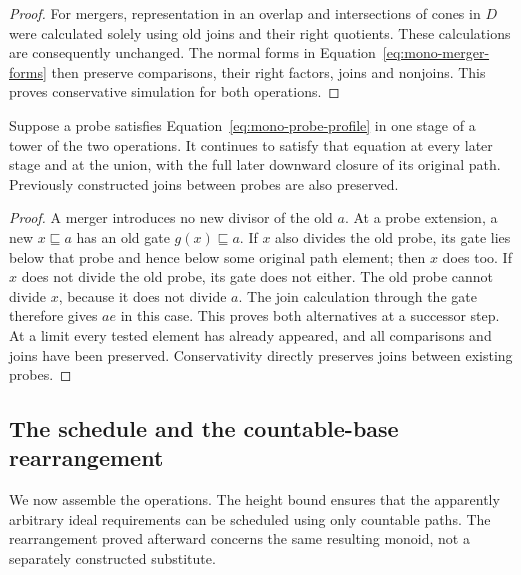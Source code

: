 \begin{proof}
For mergers, representation in an overlap and intersections of cones
in $D$ were calculated solely using old joins and their right
quotients.  These calculations are consequently unchanged.  The
normal forms in Equation~\eqref{eq:mono-merger-forms} then preserve
comparisons, their right factors, joins and nonjoins.  This proves
conservative simulation for both operations.
\end{proof}

\begin{lemma}\label{lem:mono-profile-persistence}
Suppose a probe satisfies Equation~\eqref{eq:mono-probe-profile} in
one stage of a tower of the two operations.  It continues to satisfy
that equation at every later stage and at the union, with the full
later downward closure of its original path.  Previously constructed
joins between probes are also preserved.
\end{lemma}
\begin{proof}
A merger introduces no new divisor of the old $a$.  At a probe
extension, a new $x\sqsubseteq a$ has an old gate
$g(x)\sqsubseteq a$.  If $x$ also divides the old probe, its gate
lies below that probe and hence below some original path element;
then $x$ does too.  If $x$ does not divide the old probe, its gate
does not either.  The old probe cannot divide $x$, because it does
not divide $a$.  The join calculation through the gate therefore
gives $ae$ in this case.  This proves both alternatives at a successor
step.  At a limit every tested element has already appeared, and all
comparisons and joins have been preserved.  Conservativity directly
preserves joins between existing probes.
\end{proof}

\subsection{The schedule and the countable-base rearrangement}

We now assemble the operations.  The height bound ensures that the
apparently arbitrary ideal requirements can be scheduled using only
countable paths.  The rearrangement proved afterward concerns the
same resulting monoid, not a separately constructed substitute.

